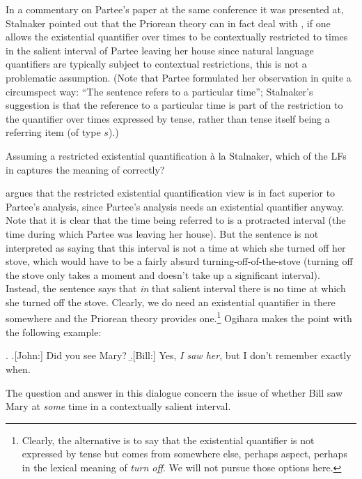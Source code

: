 In a commentary on Partee's paper at the same conference it was presented at, Stalnaker pointed out that the Priorean theory can in fact deal with \LLast, if one allows the existential quantifier over times to be contextually restricted to times in the salient interval of Partee leaving her house \dash since natural language quantifiers are typically subject to contextual restrictions, this is not a problematic assumption. (Note that Partee formulated her observation in quite a circumspect way: ``The sentence refers to a particular time''; Stalnaker's suggestion is that the reference to a particular time is part of the restriction to the quantifier over times expressed by tense, rather than tense itself being a referring item (of type $s$).)

\begin{exercise}
	Assuming a restricted existential quantification à la Stalnaker, which of the LFs in \Last captures the meaning of \LLast correctly?\eex
\end{exercise}

\citet{ogihara:1995:tense-embedded} argues that the restricted existential quantification view is in fact superior to Partee's analysis, since Partee's analysis needs an existential quantifier anyway. Note that it is clear that the time being referred to is a protracted interval (the time during which Partee was leaving her house). But the sentence is not interpreted as saying that this interval is not a time at which she turned off her stove, which would have to be a fairly absurd turning-off-of-the-stove (turning off the stove only takes a moment and doesn't take up a significant interval). Instead, the sentence says that \emph{in} that salient interval there is no time at which she turned off the stove. Clearly, we do need an existential quantifier in there somewhere and the Priorean theory provides one.\footnote{Clearly, the alternative is to say that the existential quantifier is not expressed by tense but comes from somewhere else, perhaps aspect, perhaps in the lexical meaning of \emph{turn off}. We will not pursue those options here.} Ogihara makes the point with the following example:

\ex. \a.[John:] Did you see Mary? 
\b.[Bill:] Yes, \emph{I saw her}, but I don't remember exactly when.

The question and answer in this dialogue concern the issue of whether Bill saw Mary at \emph{some} time in a contextually salient interval.

